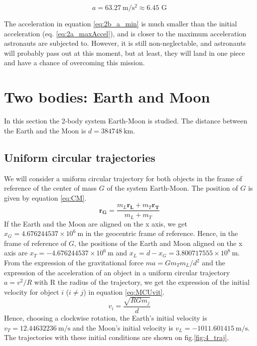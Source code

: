 \documentclass[a4paper,12pt,twoside]{article}
\begin{document}
\begin{equation}
  a = \SI{63.27}{\meter\per\square\second} \approx \num{6.45}\text{ G} %
  \label{eq:2b_a_min}
\end{equation}

The acceleration in equation \eqref{eq:2b_a_min} is much smaller than the initial acceleration (eq. \eqref{eq:2a_maxAccel}), and is closer to the maximum acceleration astronauts are subjected to.
However, it is still non-neglectable, and astronauts will probably pass out at this moment, but at least, they will land in one piece and have a chance of overcoming this mission.

\section{Two bodies: Earth and Moon}
In this section the 2-body system Earth-Moon is studied. The distance between the Earth and the Moon is $d = 384748 ~\si{\km}$.

\subsection{Uniform circular trajectories}
We will consider a uniform circular trajectory for both objects in the frame of reference of the center of mass $G$ of the system Earth-Moon. The position of $G$ is given by equation \eqref{eq:CM}.
\begin{equation}
\mathbf{r_G} = \frac{m_L \mathbf{r_L} + m_T \mathbf{r_T}}{m_L + m_T}
\label{eq:CM}
\end{equation}
If the Earth and the Moon are aligned on the x axis, we get $x_G = 4.676244537 \times 10^6 ~\si{\m}$ in the geocentric frame of reference. Hence, in the frame of reference of $G$, the positions of the Earth and Moon aligned on the x axis are $x_T = -4.676244537 \times 10^6 ~\si{\m}$ and $x_L = d-x_G = 3.800717555 \times 10^8 ~\si{\m}$.\\
From the expression of the gravitational force $ma = G m_T m_L/d^2$ and the expression of the acceleration of an object in a uniform circular trajectory $a = v^2/R$ with R the radius of the trajectory, we get the expression of the initial velocity for object $i$ ($i \neq j$) in equation \eqref{eq:MCUvit}.
\begin{equation}
v_i = \frac{\sqrt{RG m_j}}{d}
\label{eq:MCUvit}
\end{equation}
Hence, choosing a clockwise rotation, the Earth's initial velocity is $v_T = 12.44632236 ~\si{\m \per \s}$ and the Moon's initial velocity is $v_L = -1011.601415~\si{\m \per \s}$. The trajectories with these initial conditions are shown on fig.\ref{fig:4_traj}.
\end{document}
